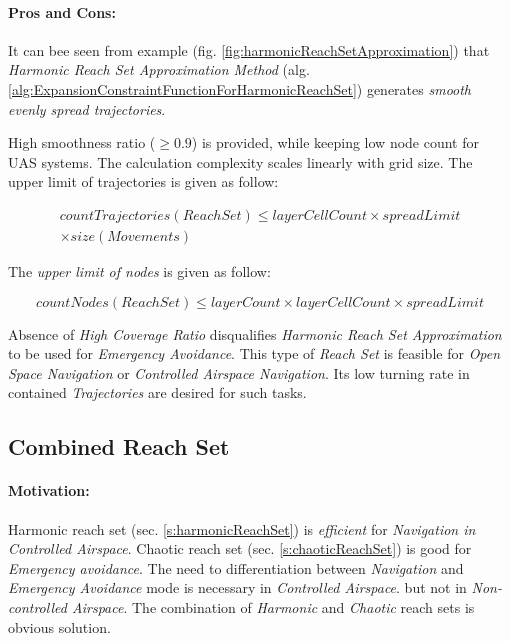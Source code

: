 \paragraph{Pros and Cons:} It can bee seen from example (fig. \ref{fig:harmonicReachSetApproximation}) that \emph{Harmonic Reach Set Approximation Method} (alg. \ref{alg:ExpansionConstraintFunctionForHarmonicReachSet}) generates \emph{smooth evenly spread trajectories}.
    
High smoothness ratio ($\ge 0.9$) is provided, while keeping low node count for UAS systems. The calculation complexity scales linearly with grid size. The upper limit of trajectories is given as follow:

\begin{multline}
    countTrajectories(ReachSet) \le layerCellCount \times spreadLimit \\\times size(Movements)
\end{multline}

\noindent The \emph{upper limit of nodes} is given as follow:

\begin{equation}
    countNodes(ReachSet) \le layerCount \times layerCellCount \times spreadLimit
\end{equation}

\noindent Absence of \emph{High Coverage Ratio} disqualifies \emph{Harmonic Reach Set Approximation} to be used for \emph{Emergency Avoidance}. This type of \emph{Reach Set} is feasible for \emph{Open Space Navigation} or \emph{Controlled Airspace Navigation}. Its low turning rate in contained \emph{Trajectories} are desired for such tasks. 



\subsection{Combined Reach Set}\label{s:combinedReachSet}
\paragraph{Motivation:} Harmonic reach set (sec. \ref{s:harmonicReachSet}) is \emph{efficient} for \emph{Navigation in \emph{Controlled Airspace}}. Chaotic reach set (sec. \ref{s:chaoticReachSet}) is good for \emph{Emergency avoidance}. The need to differentiation between \emph{Navigation} and \emph{Emergency Avoidance} mode is necessary in \emph{Controlled Airspace}. but not in \emph{Non-controlled Airspace}. The combination of \emph{Harmonic} and \emph{Chaotic} reach sets is obvious solution. 

